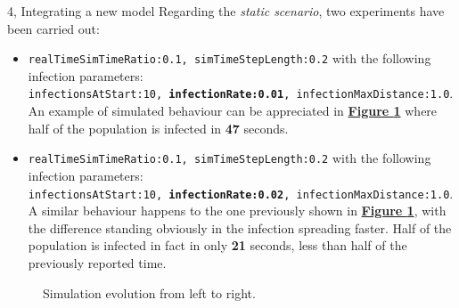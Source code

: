 \documentclass[10pt,a4paper]{article}
\begin{document}
\begin{task}{4, Integrating a new model}
Regarding the \textit{static scenario}, two experiments have been carried out:
\begin{itemize}
    \item \texttt{realTimeSimTimeRatio:0.1, simTimeStepLength:0.2} with the following infection parameters:\\ \texttt{infectionsAtStart:10, \textbf{infectionRate:0.01}, infectionMaxDistance:1.0}. An example of simulated behaviour can be appreciated in \textbf{\hyperref[fig:4.5.1]{Figure \ref{fig:4.5.1}}} where half of the population is infected in \textbf{47} seconds. 
    \item \texttt{realTimeSimTimeRatio:0.1, simTimeStepLength:0.2} with the following infection parameters:\\ \texttt{infectionsAtStart:10, \textbf{infectionRate:0.02}, infectionMaxDistance:1.0}. A similar behaviour happens to the one previously shown in \textbf{\hyperref[fig:4.5.1]{Figure \ref{fig:4.5.1}}}, with the difference standing obviously in the infection spreading faster. Half of the population is infected in fact in only \textbf{21} seconds, less than half of the previously reported time. 
\end{itemize}

\begin{figure}[H]
    \centering
    \hfill
    \hfill
    \caption{Simulation evolution from left to right.}
    \label{fig:4.5.1}
\end{figure}


\end{task}
\end{document}
